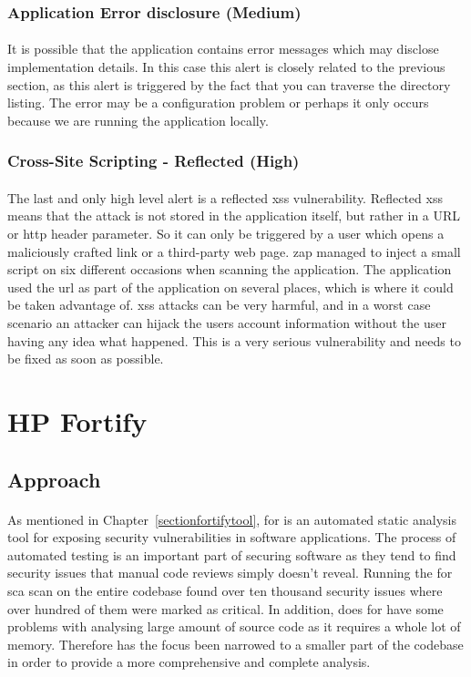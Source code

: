 \documentclass[11pt,english,a4paper]{report}
\begin{document}
\subsubsection{Application Error disclosure (Medium)}
\paragraph{}
It is possible that the application contains error messages which may disclose implementation details. 
In this case this alert is closely related to the previous section, as this alert is triggered by the fact that you can traverse the directory listing. 
The error may be a configuration problem or perhaps it only occurs because we are running the application locally.

\subsubsection{Cross-Site Scripting - Reflected (High)}
\paragraph{}
The last and only high level alert is a reflected \gls{xss} vulnerability. 
Reflected \gls{xss} means that the attack is not stored in the application itself, but rather in a URL or \gls{http} header parameter.
So it can only be triggered by a user which opens a maliciously crafted link or a third-party web page.
\gls{zap} managed to inject a small script on six different occasions when scanning the application.
The application used the \gls{url} as part of the application on several places, which is where it could be taken advantage of.
\gls{xss} attacks can be very harmful, and in a worst case scenario an attacker can hijack the users account information without the user having any idea what happened.
This is a very serious vulnerability and needs to be fixed as soon as possible.


\section{HP Fortify}
\label{sec:hpfortify}
\subsection{Approach}
\paragraph{}
As mentioned in Chapter~\ref{sectionfortifytool}, \gls{for} is an automated static analysis tool for exposing security vulnerabilities in software applications. 
The process of automated testing is an important part of securing software as they tend to find security issues that manual code reviews simply doesn't reveal.
Running the \gls{for} \gls{sca} scan on the entire codebase found over ten thousand security issues where over hundred of them were marked as critical.
In addition, does \gls{for} have some problems with analysing large amount of source code as it requires a whole lot of memory.
Therefore has the focus been narrowed to a smaller part of the codebase in order to provide a more comprehensive and complete analysis.
\end{document}
